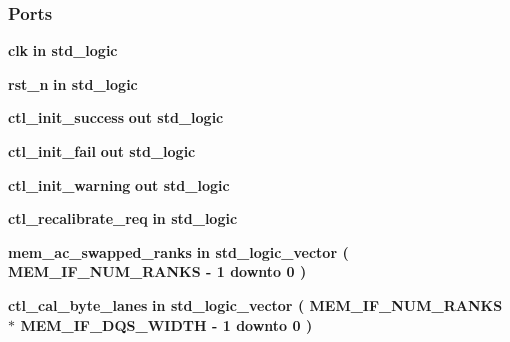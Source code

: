 \subsubsection*{Ports}
 \begin{DoxyCompactItemize}
\item 
{\bf clk}  {\bfseries {\bfseries \textcolor{keywordflow}{in}\textcolor{vhdlchar}{ }}} {\bfseries \textcolor{comment}{std\+\_\+logic}\textcolor{vhdlchar}{ }} 
\item 
{\bf rst\+\_\+n}  {\bfseries {\bfseries \textcolor{keywordflow}{in}\textcolor{vhdlchar}{ }}} {\bfseries \textcolor{comment}{std\+\_\+logic}\textcolor{vhdlchar}{ }} 
\item 
{\bf ctl\+\_\+init\+\_\+success}  {\bfseries {\bfseries \textcolor{keywordflow}{out}\textcolor{vhdlchar}{ }}} {\bfseries \textcolor{comment}{std\+\_\+logic}\textcolor{vhdlchar}{ }} 
\item 
{\bf ctl\+\_\+init\+\_\+fail}  {\bfseries {\bfseries \textcolor{keywordflow}{out}\textcolor{vhdlchar}{ }}} {\bfseries \textcolor{comment}{std\+\_\+logic}\textcolor{vhdlchar}{ }} 
\item 
{\bf ctl\+\_\+init\+\_\+warning}  {\bfseries {\bfseries \textcolor{keywordflow}{out}\textcolor{vhdlchar}{ }}} {\bfseries \textcolor{comment}{std\+\_\+logic}\textcolor{vhdlchar}{ }} 
\item 
{\bf ctl\+\_\+recalibrate\+\_\+req}  {\bfseries {\bfseries \textcolor{keywordflow}{in}\textcolor{vhdlchar}{ }}} {\bfseries \textcolor{comment}{std\+\_\+logic}\textcolor{vhdlchar}{ }} 
\item 
{\bf mem\+\_\+ac\+\_\+swapped\+\_\+ranks}  {\bfseries {\bfseries \textcolor{keywordflow}{in}\textcolor{vhdlchar}{ }}} {\bfseries \textcolor{comment}{std\+\_\+logic\+\_\+vector}\textcolor{vhdlchar}{ }\textcolor{vhdlchar}{(}\textcolor{vhdlchar}{ }\textcolor{vhdlchar}{ }\textcolor{vhdlchar}{ }\textcolor{vhdlchar}{ }{\bfseries {\bf M\+E\+M\+\_\+\+I\+F\+\_\+\+N\+U\+M\+\_\+\+R\+A\+N\+KS}} \textcolor{vhdlchar}{-\/}\textcolor{vhdlchar}{ } \textcolor{vhdldigit}{1} \textcolor{vhdlchar}{ }\textcolor{keywordflow}{downto}\textcolor{vhdlchar}{ }\textcolor{vhdlchar}{ } \textcolor{vhdldigit}{0} \textcolor{vhdlchar}{ }\textcolor{vhdlchar}{)}\textcolor{vhdlchar}{ }} 
\item 
{\bf ctl\+\_\+cal\+\_\+byte\+\_\+lanes}  {\bfseries {\bfseries \textcolor{keywordflow}{in}\textcolor{vhdlchar}{ }}} {\bfseries \textcolor{comment}{std\+\_\+logic\+\_\+vector}\textcolor{vhdlchar}{ }\textcolor{vhdlchar}{(}\textcolor{vhdlchar}{ }\textcolor{vhdlchar}{ }\textcolor{vhdlchar}{ }\textcolor{vhdlchar}{ }{\bfseries {\bf M\+E\+M\+\_\+\+I\+F\+\_\+\+N\+U\+M\+\_\+\+R\+A\+N\+KS}} \textcolor{vhdlchar}{$\ast$}\textcolor{vhdlchar}{ }\textcolor{vhdlchar}{ }\textcolor{vhdlchar}{ }{\bfseries {\bf M\+E\+M\+\_\+\+I\+F\+\_\+\+D\+Q\+S\+\_\+\+W\+I\+D\+TH}} \textcolor{vhdlchar}{-\/}\textcolor{vhdlchar}{ } \textcolor{vhdldigit}{1} \textcolor{vhdlchar}{ }\textcolor{keywordflow}{downto}\textcolor{vhdlchar}{ }\textcolor{vhdlchar}{ } \textcolor{vhdldigit}{0} \textcolor{vhdlchar}{ }\textcolor{vhdlchar}{)}\textcolor{vhdlchar}{ }} 

\end{DoxyCompactItemize}
